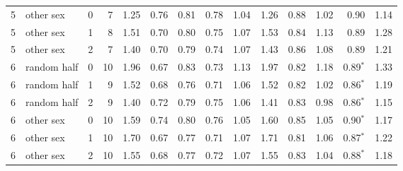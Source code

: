 \begin{table}[h]
\begin{tabular}{rlrr r rrrr r rrrr}
5 & other sex & 0 & 7 & 1.25 & 0.76 & 0.81 & 0.78 & 1.04 & 1.26 & 0.88 & 1.02 & 0.90 & 1.14 \\
5 & other sex & 1 & 8 & 1.51 & 0.70 & 0.80 & 0.75 & 1.07 & 1.53 & 0.84 & 1.13 & 0.89 & 1.28 \\
5 & other sex & 2 & 7 & 1.40 & 0.70 & 0.79 & 0.74 & 1.07 & 1.43 & 0.86 & 1.08 & 0.89 & 1.21 \\
6 & random half & 0 & 10 & 1.96 & 0.67 & 0.83 & 0.73 & 1.13 & 1.97 & 0.82 & 1.18 & 0.89$^\ast$ & 1.33 \\
6 & random half & 1 & 9 & 1.52 & 0.68 & 0.76 & 0.71 & 1.06 & 1.52 & 0.82 & 1.02 & 0.86$^\ast$ & 1.19 \\
6 & random half & 2 & 9 & 1.40 & 0.72 & 0.79 & 0.75 & 1.06 & 1.41 & 0.83 & 0.98 & 0.86$^\ast$ & 1.15 \\
6 & other sex & 0 & 10 & 1.59 & 0.74 & 0.80 & 0.76 & 1.05 & 1.60 & 0.85 & 1.05 & 0.90$^\ast$ & 1.17 \\
6 & other sex & 1 & 10 & 1.70 & 0.67 & 0.77 & 0.71 & 1.07 & 1.71 & 0.81 & 1.06 & 0.87$^\ast$ & 1.22 \\
6 & other sex & 2 & 10 & 1.55 & 0.68 & 0.77 & 0.72 & 1.07 & 1.55 & 0.83 & 1.04 & 0.88$^\ast$ & 1.18 \\
\bottomrule
\end{tabular}
\end{table}
